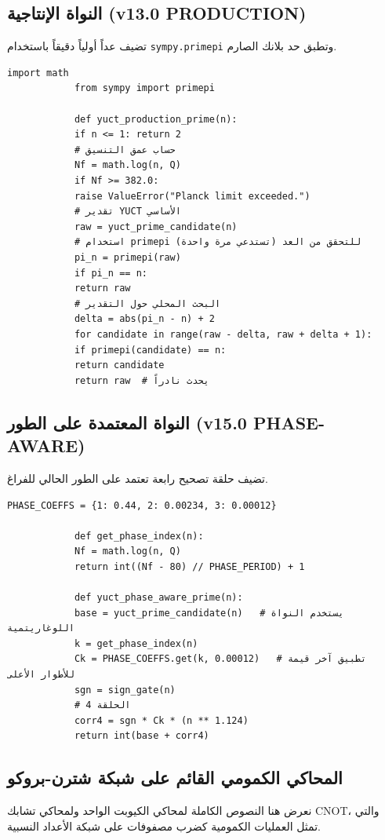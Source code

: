 \documentclass[12pt,a4paper]{article}
\begin{document}
	\subsection{النواة الإنتاجية (v13.0 PRODUCTION)}
	تضيف عداً أولياً دقيقاً باستخدام \texttt{sympy.primepi} وتطبق حد بلانك الصارم.
	
	\begin{english}
		\begin{lstlisting}[caption={yuct\_final\_prime.py (v13.0 PRODUCTION)}]
			import math
			from sympy import primepi
			
			def yuct_production_prime(n):
			if n <= 1: return 2
			# حساب عمق التنسيق
			Nf = math.log(n, Q)
			if Nf >= 382.0:
			raise ValueError("Planck limit exceeded.")
			# تقدير YUCT الأساسي
			raw = yuct_prime_candidate(n)
			# استخدام primepi للتحقق من العد (تستدعي مرة واحدة)
			pi_n = primepi(raw)
			if pi_n == n:
			return raw
			# البحث المحلي حول التقدير
			delta = abs(pi_n - n) + 2
			for candidate in range(raw - delta, raw + delta + 1):
			if primepi(candidate) == n:
			return candidate
			return raw  # يحدث نادراً
		\end{lstlisting}
	\end{english}
	
	\subsection{النواة المعتمدة على الطور (v15.0 PHASE-AWARE)}
	تضيف حلقة تصحيح رابعة تعتمد على الطور الحالي للفراغ.
	
	\begin{english}
		\begin{lstlisting}[caption={yuct\_phase\_aware.py (v15.0)}]
			PHASE_COEFFS = {1: 0.44, 2: 0.00234, 3: 0.00012}
			
			def get_phase_index(n):
			Nf = math.log(n, Q)
			return int((Nf - 80) // PHASE_PERIOD) + 1
			
			def yuct_phase_aware_prime(n):
			base = yuct_prime_candidate(n)   # يستخدم النواة اللوغاريتمية
			k = get_phase_index(n)
			Ck = PHASE_COEFFS.get(k, 0.00012)   # تطبيق آخر قيمة للأطوار الأعلى
			sgn = sign_gate(n)
			# الحلقة 4
			corr4 = sgn * Ck * (n ** 1.124)
			return int(base + corr4)
		\end{lstlisting}
	\end{english}
	
	\subsection{المحاكي الكمومي القائم على شبكة شترن-بروكو}
	نعرض هنا النصوص الكاملة لمحاكي الكيوبت الواحد ولمحاكي تشابك CNOT، والتي تمثل العمليات الكمومية كضرب مصفوفات على شبكة الأعداد النسبية.
	
\end{document}
